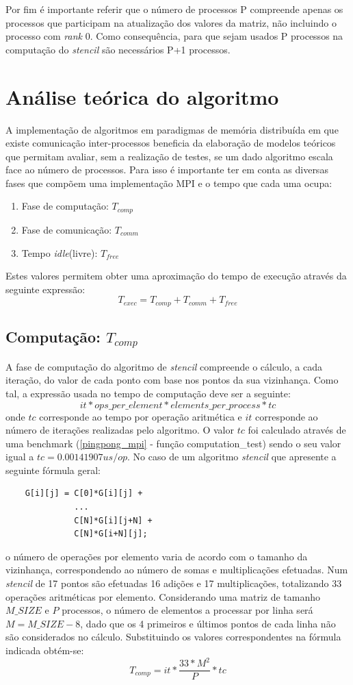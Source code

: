 \documentclass{article}
\begin{document}
Por fim é importante referir que o número de processos P compreende apenas os processos que participam na 
atualização dos valores da matriz, não incluindo o processo com \textit{rank} 0. Como consequência, para que 
sejam usados P processos na computação do \textit{stencil} são necessários P+1 processos.

\section{Análise teórica do algoritmo} \label{analise}
A implementação de algoritmos em paradigmas de memória distribuída em que existe 
comunicação inter-processos beneficia da elaboração de modelos teóricos que permitam
avaliar, sem a realização de testes, se um dado algoritmo escala face ao número de 
processos. Para isso é importante ter em conta as diversas fases que compõem uma 
implementação MPI e o tempo que cada uma ocupa: 
\begin{enumerate}
    \item Fase de computação: $T_{comp}$
    \item Fase de comunicação: $T_{comm}$
    \item Tempo \textit{idle}(livre): $T_{free}$
\end{enumerate}
Estes valores permitem obter uma aproximação do tempo de execução através da seguinte 
expressão: \label{t_par}
$$T_{exec} = T_{comp} + T_{comm} + T_{free}$$

\subsection{Computação: $T_{comp}$}
A fase de computação do algoritmo de \textit{stencil} compreende o cálculo, a cada
iteração, do valor de cada ponto com base nos pontos da sua vizinhança. Como tal, a 
expressão usada no tempo de computação deve ser a seguinte:
$$it * ops\_per\_element * elements\_per\_process * tc$$
onde $tc$ corresponde ao tempo por operação aritmética e $it$ corresponde ao número
de iterações realizadas pelo algoritmo. O valor $tc$ foi calculado através de uma benchmark 
(\ref{pingpong_mpi} - função computation\_test) sendo o seu valor igual a $tc=0.00141907 us/op$. 
No caso de um algoritmo \textit{stencil} que apresente a seguinte fórmula geral:
\begin{verbatim}
    G[i][j] = C[0]*G[i][j] + 
              ... 
              C[N]*G[i][j+N] + 
              C[N]*G[i+N][j];
\end{verbatim}
o número de operações por elemento varia de acordo com o tamanho da vizinhança, 
correspondendo ao número de somas e multiplicações efetuadas. Num \textit{stencil} 
de 17 pontos são efetuadas 16 adições e 17 multiplicações, totalizando 33 operações 
aritméticas por elemento. Considerando uma matriz de tamanho $M\_SIZE$ e $P$ processos, 
o número de elementos a processar por linha será $M=M\_SIZE-8$, dado que os 4 primeiros 
e últimos pontos de cada linha não são considerados no cálculo. Substituindo os valores 
correspondentes na fórmula indicada obtém-se:
$$T_{comp} = it*\frac{33*M^2}{P}*tc$$
\end{document}
